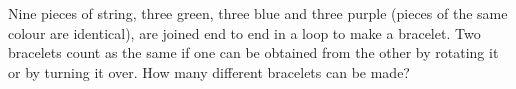 Nine pieces of string, three green, three blue and three purple (pieces of the same colour are identical), are joined end to end in a loop to make a bracelet. Two bracelets count as the same if one can be obtained from the other by rotating it or by turning it over. How many different bracelets can be made?
